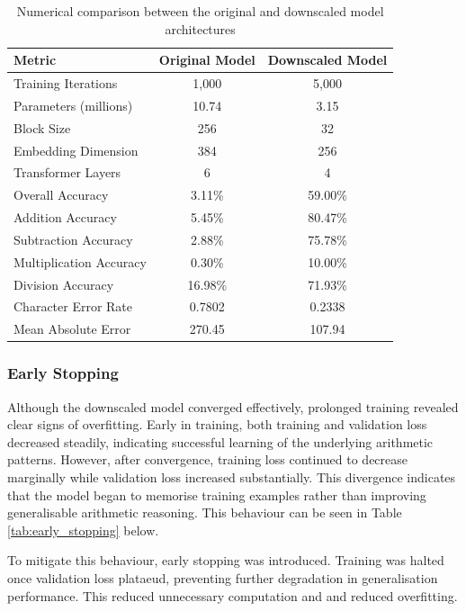 \begin{table}[h]
\centering
\begin{tabular}{lcc}
\hline
\textbf{Metric} & \textbf{Original Model} & \textbf{Downscaled Model} \\
\hline
Training Iterations & 1{,}000 & 5{,}000 \\
Parameters (millions) & 10.74 & 3.15 \\
Block Size & 256 & 32 \\
Embedding Dimension & 384 & 256 \\
Transformer Layers & 6 & 4 \\
\hline
Overall Accuracy & 3.11\% & 59.00\% \\
Addition Accuracy & 5.45\% & 80.47\% \\
Subtraction Accuracy & 2.88\% & 75.78\% \\
Multiplication Accuracy & 0.30\% & 10.00\% \\
Division Accuracy & 16.98\% & 71.93\% \\
Character Error Rate & 0.7802 & 0.2338 \\
Mean Absolute Error & 270.45 & 107.94 \\
\hline
\end{tabular}
\caption{Numerical comparison between the original and downscaled model architectures}
\label{tab:results_downscaled}
\end{table}

\subsubsection{Early Stopping}
Although the downscaled model converged effectively, prolonged training revealed clear signs of overfitting. Early in training, both training and validation loss decreased steadily, indicating successful learning of the underlying arithmetic patterns. However, after convergence, training loss continued to decrease marginally while validation loss increased substantially. This divergence indicates that the model began to memorise training examples rather than improving generalisable arithmetic reasoning. This behaviour can be seen in Table \ref{tab:early_stopping} below.

To mitigate this behaviour, early stopping was introduced. Training was halted once validation loss plataeud, preventing further degradation in generalisation performance. This reduced unnecessary computation and and reduced overfitting.

